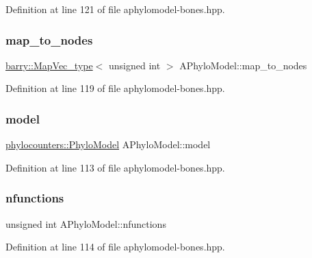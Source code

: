 Definition at line 121 of file aphylomodel-\/bones.\+hpp.

\mbox{\label{class_a_phylo_model_ae041cf2aa3630fab0a050e176c9317f9}} 
\subsubsection{\texorpdfstring{map\+\_\+to\+\_\+nodes}{map\_to\_nodes}}
{\footnotesize\ttfamily \hyperlink{namespacebarry_a2f0d3aab1d67e4c8eaeab9022e16139f}{barry\+::\+Map\+Vec\+\_\+type}$<$ unsigned int $>$ A\+Phylo\+Model\+::map\+\_\+to\+\_\+nodes}



Definition at line 119 of file aphylomodel-\/bones.\+hpp.

\mbox{\label{class_a_phylo_model_a8594c24aab4b3fe46cd2e4976c2031d9}} 
\subsubsection{\texorpdfstring{model}{model}}
{\footnotesize\ttfamily \hyperlink{namespacebarry_1_1counters_1_1phylo_ad32b4186e3bab93119df225fddc3c609}{phylocounters\+::\+Phylo\+Model} A\+Phylo\+Model\+::model}



Definition at line 113 of file aphylomodel-\/bones.\+hpp.

\mbox{\label{class_a_phylo_model_aceefd34597d56589a10162c937d8200f}} 
\subsubsection{\texorpdfstring{nfunctions}{nfunctions}}
{\footnotesize\ttfamily unsigned int A\+Phylo\+Model\+::nfunctions}



Definition at line 114 of file aphylomodel-\/bones.\+hpp.

\mbox{\label{class_a_phylo_model_af48d7223972ea6f74d2780b316db730e}} 
